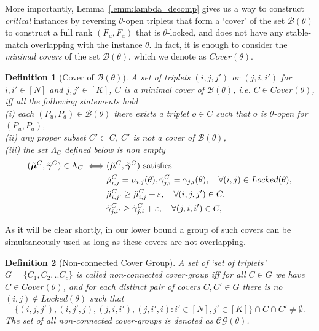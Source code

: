\documentclass{article}
\newtheorem{definition}{Definition}
\begin{document}
More importantly, Lemma~\ref{lemm:lambda_decomp} gives us a way to construct {\em critical} instances by reversing $\theta$-open triplets that form a `cover' of the set $\mathcal{B}(\theta)$ to construct a full rank $(F_u, F_a)$ that is $\theta$-locked, and does not have any stable-match overlapping with the instance $\theta$. In fact, it is enough to consider the {\em minimal covers} of the set $\mathcal{B}(\theta)$, which we denote as $Cover(\theta)$.  
\begin{definition}[Cover of $\mathcal{B}(\theta)$] \label{def:cover}
A set of triplets $(i,j,j')$ or $(j,i,i')$ for $i,i'\in [N]$ and $j,j'\in [K]$, $C$ is a minimal cover of $\mathcal{B}(\theta)$, i.e. $C \in Cover(\theta)$, \emph{iff} all the following statements hold\\
(i) each $(P_u, P_a) \in \mathcal{B}(\theta)$ there exists a triplet $o \in C$ such that $o$ is  $\theta$-open for $(P_u, P_a)$, \\ 
(ii) any proper subset $C' \subset C$, $C'$ is not a cover of $\mathcal{B}(\theta)$,\\
(iii) the set $\Lambda_C$ defined below is non empty
\begin{align}
(\boldsymbol{\tilde{\mu}}^{C}, \boldsymbol{\tilde{\gamma}}^{C}) \in \Lambda_C   \iff &(\boldsymbol{\tilde{\mu}}^{C}, \boldsymbol{\tilde{\gamma}}^{C}) \text{ satisfies} \notag\\
&\tilde{\mu}_{i,j}^{C} =  \mu_{i,j}(\theta), \tilde{\gamma}_{j,i}^{C} =  \gamma_{j,i}(\theta), \quad\forall (i,j) \in Locked(\theta),  \label{eq:lower_4}\\
&\tilde{\mu}_{i,j'}^{C} \geq \tilde{\mu}_{i,j}^{C} + \varepsilon,  \quad\forall (i, j, j') \in C,  \label{eq:lower_5}\\
&\tilde{\gamma}_{j,i'}^{C} \geq \tilde{\gamma}_{j,i}^{C} + \varepsilon, \quad\forall (j, i, i') \in C, \label{eq:lower_6}
\end{align}
\end{definition} 

As it will be clear shortly, in our lower bound a group of such covers can be simultaneously used as long as these covers are not overlapping.  
\begin{definition}[Non-connected Cover Group]\label{def:cover_group}
A set of `set of triplets' $G = \{C_1, C_2, ..C_c\}$ is called {\em non-connected cover-group} iff for all $C \in G$ we have $C \in Cover(\theta)$, and for each distinct pair of covers $C, C' \in G$ there is no $(i,j) \notin Locked(\theta)$ such that 
$$\{(i,j, j'), (i, j', j), (j, i, i'), (j, i', i): i' \in [N], j'\in [K] \} \cap C \cap C' \neq \emptyset.
$$ The set of all non-connected cover-groups is denoted as $\mathcal{CG}(\theta)$. 
\end{definition}
\end{document}
